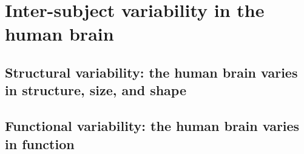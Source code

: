 
\section{Inter-subject variability in the human brain}
\subsection{Structural variability: the human brain varies in structure, size, and shape}
\subsection{Functional variability: the human brain varies in function}

  









